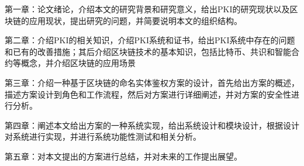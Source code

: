 
第一章：论文绪论，介绍本文的研究背景和研究意义，给出PKI的研究现状以及区块链的应用现状，提出研究的问题，并简要说明本文的组织结构。

第二章：介绍PKI的相关知识，介绍PKI系统和证书，给出PKI系统中存在的问题和已有的改善措施；其后介绍区块链技术的基本知识，包括比特币、共识和智能合约等概念，并介绍区块链的应用场景

第三章：介绍一种基于区块链的命名实体鉴权方案的设计，首先给出方案的概述，描述方案设计到角色和工作流程，然后对方案进行详细阐述，并对方案的安全性进行分析。

第四章：阐述本文给出方案的一种系统实现，给出系统设计和模块设计，根据设计对系统进行实现，并进行系统功能性测试和相关分析。

第五章：对本文提出的方案进行总结，并对未来的工作提出展望。



